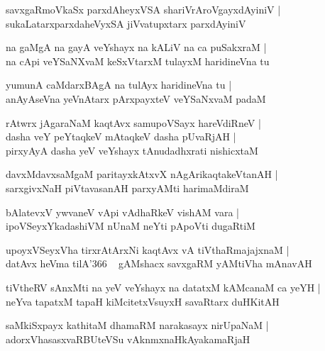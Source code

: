 \documentclass[twoside,12pt,openright]{book}
\newcounter{shloka}[chapter]
\begin{document}
\begin{shloka}
savxgaRmoVkaSx parxdAheyxVSA shariVrAroVgayxdAyiniV |\\
sukaLatarxparxdaheVyxSA jiVvatupxtarx parxdAyiniV 
\end{shloka}

\begin{shloka}
na gaMgA na gayA veYshayx na kALiV na ca puSakxraM |\\
na cApi veYSaNXvaM keSxVtarxM tulayxM haridineVna tu 
\end{shloka}

\begin{shloka}
yumunA caMdarxBAgA na tulAyx haridineVna tu |\\
anAyAseVna yeVnAtarx pArxpayxteV veYSaNxvaM padaM 
\end{shloka}

\begin{shloka}
rAtwrx jAgaraNaM kaqtAvx samupoVSayx hareVdiRneV |\\
dasha veY peYtaqkeV mAtaqkeV dasha pUvaRjAH |\\
pirxyAyA dasha yeV veYshayx tAnudadhxrati nishicxtaM
\end{shloka}

\begin{shloka}
davxMdavxsaMgaM paritayxkAtxvX nAgArikaqtakeVtanAH |\\
sarxgivxNaH piVtavasanAH parxyAMti harimaMdiraM 
\end{shloka}

\begin{shloka}
bAlatevxV ywvaneV vApi vAdhaRkeV vishAM vara |\\
ipoVSeyxYkadashiVM nUnaM neYti pApoVti dugaRtiM 
\end{shloka}

\begin{shloka}
upoyxVSeyxVha tirxrAtArxNi kaqtAvx vA tiVthaRmajajxnaM |\\
datAvx heVma tilA\char'366 ~ gAMshacx savxgaRM yAMtiVha mAnavAH 
\end{shloka}

\begin{shloka}
tiVtheRV sAnxMti na yeV veYshayx na datatxM kAMcanaM ca yeYH |\\
neYva tapatxM tapaH kiMcitetxVsuyxH savaRtarx duHKitAH
\end{shloka}

\begin{shloka}
saMkiSxpayx kathitaM dhamaRM narakasayx nirUpaNaM |\\
adorxVhasasxvaRBUteVSu vAknmxnaHkAyakamaRjaH 
\end{shloka}
\end{document}
